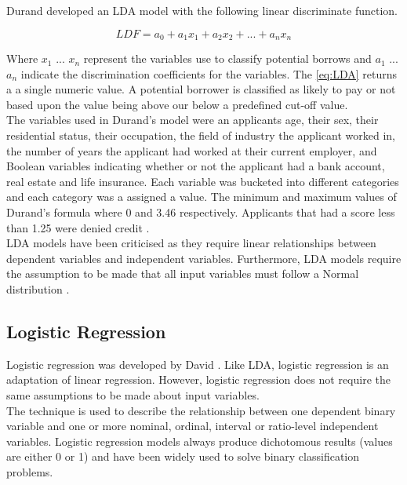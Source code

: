 Durand developed an LDA model with the following linear discriminate function.

\vspace{15pt}

\begin{equation} \label{eq:LDA}
LDF = a_{0} + a_{1}x_{1} + a_{2}x_{2}+ ... +  a_{n}x_{n}
\end{equation}

\vspace{15pt}

Where $x_{1}$ ... $x_{n}$ represent the variables use to classify potential borrows and $a_{1}$ ... $a_{n}$ indicate the discrimination coefficients for the variables. The \ref{eq:LDA} returns a a single numeric value. A potential borrower is classified as likely to pay or not based upon the value being above our below a predefined cut-off value. \\

The variables used in Durand's model were an applicants age, their sex, their residential status, their occupation, the field of industry the applicant worked in, the number of years the applicant had worked at their current employer, and Boolean variables indicating whether or not the applicant had a bank account, real estate and life insurance. Each variable was bucketed into different categories and each category was a assigned a value. The minimum and maximum values of Durand's formula where 0 and 3.46 respectively. Applicants that had a score less than 1.25 were denied credit \parencite{DurandLDA}.  \\

LDA models have been criticised as they require linear relationships
between dependent variables and independent variables. Furthermore, LDA models require the assumption to be made that all input variables must follow a Normal distribution \parencite{CreditScoringTechniquesOverview}. \newpage

\subsection{Logistic Regression}

Logistic regression was developed by David \textcite{LogReg}. Like LDA, logistic regression is an adaptation of linear regression. However, logistic regression does not require the same assumptions to be made about input variables. \\

The technique is used to describe the relationship between one dependent binary variable and one or more nominal, ordinal, interval or ratio-level independent variables. Logistic regression models always produce dichotomous results (values are either 0 or 1) and have been widely used to solve binary classification problems. \\

